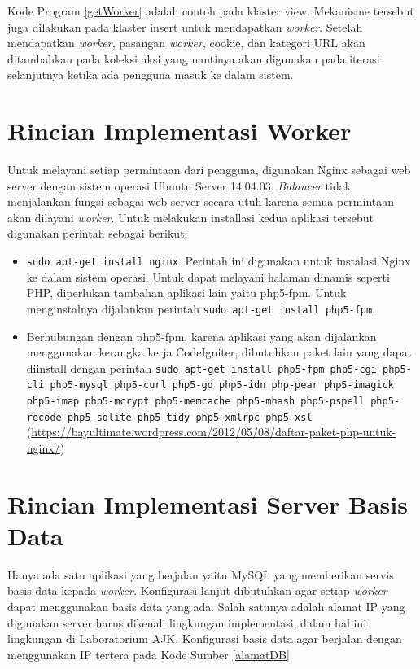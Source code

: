 \documentclass{ta-its}
\begin{document}
				Kode Program \ref{getWorker} adalah contoh pada klaster view. Mekanisme tersebut juga dilakukan pada klaster insert untuk mendapatkan \textit{worker}. Setelah mendapatkan \textit{worker}, pasangan \textit{worker}, cookie, dan kategori URL akan ditambahkan pada koleksi aksi yang nantinya akan digunakan pada iterasi selanjutnya ketika ada pengguna masuk ke dalam sistem.
				
				
		
		\section{Rincian Implementasi Worker}
			Untuk melayani setiap permintaan dari pengguna, digunakan Nginx sebagai web server dengan sistem operasi Ubuntu Server 14.04.03. \textit{Balancer} tidak menjalankan fungsi sebagai web server secara utuh karena semua permintaan akan dilayani \textit{worker}. Untuk melakukan installasi kedua aplikasi tersebut digunakan perintah sebagai berikut:
			
			\begin{itemize}
				\item \texttt{sudo apt-get install nginx}. Perintah ini digunakan untuk instalasi Nginx ke dalam sistem operasi. Untuk dapat melayani halaman dinamis seperti PHP, diperlukan tambahan aplikasi lain yaitu php5-fpm. Untuk menginstalnya dijalankan perintah \texttt{sudo apt-get install php5-fpm}. 
				\item Berhubungan dengan php5-fpm, karena aplikasi yang akan dijalankan menggunakan kerangka kerja CodeIgniter, dibutuhkan paket lain yang dapat diinstall dengan perintah \texttt{sudo apt-get install php5-fpm php5-cgi php5-cli php5-mysql php5-curl php5-gd php5-idn php-pear php5-imagick php5-imap php5-mcrypt php5-memcache php5-mhash php5-pspell php5-recode php5-sqlite php5-tidy php5-xmlrpc php5-xsl} (\url{https://bayultimate.wordpress.com/2012/05/08/daftar-paket-php-untuk-nginx/})
			\end{itemize}
			
			
		
		\section{Rincian Implementasi Server Basis Data}
			Hanya ada satu aplikasi yang berjalan yaitu MySQL yang memberikan servis basis data kepada \textit{worker}. Konfigurasi lanjut dibutuhkan agar setiap \textit{worker} dapat menggunakan basis data yang ada. Salah satunya adalah alamat IP yang digunakan server harus dikenali lingkungan implementasi, dalam hal ini lingkungan di Laboratorium AJK. Konfigurasi basis data agar berjalan dengan menggunakan IP tertera pada Kode Sumber \ref{alamatDB}
			
\end{document}
